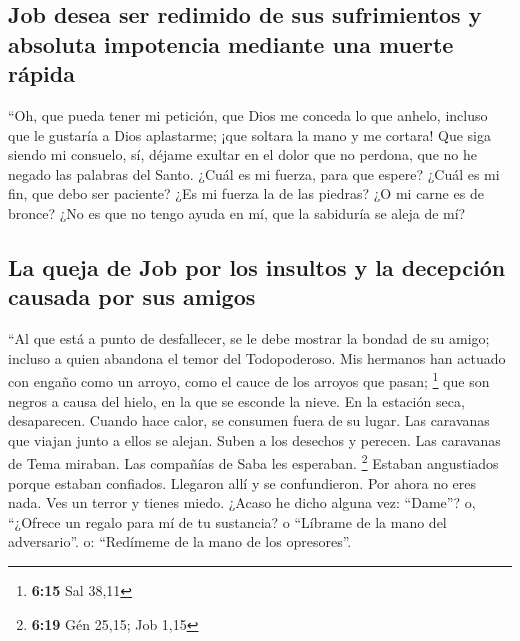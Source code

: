 \hypertarget{job-desea-ser-redimido-de-sus-sufrimientos-y-absoluta-impotencia-mediante-una-muerte-ruxe1pida}{%
\subsection{Job desea ser redimido de sus sufrimientos y absoluta
impotencia mediante una muerte
rápida}\label{job-desea-ser-redimido-de-sus-sufrimientos-y-absoluta-impotencia-mediante-una-muerte-ruxe1pida}}

 ``Oh, que pueda tener mi petición, que Dios me conceda lo
que anhelo,  incluso que le gustaría a Dios aplastarme;
¡que soltara la mano y me cortara!  Que siga siendo mi
consuelo, sí, déjame exultar en el dolor que no perdona, que no he
negado las palabras del Santo.  ¿Cuál es mi fuerza, para
que espere? ¿Cuál es mi fin, que debo ser paciente?  ¿Es
mi fuerza la de las piedras? ¿O mi carne es de bronce? 
¿No es que no tengo ayuda en mí, que la sabiduría se aleja de mí?

\hypertarget{la-queja-de-job-por-los-insultos-y-la-decepciuxf3n-causada-por-sus-amigos}{%
\subsection{La queja de Job por los insultos y la decepción causada por
sus
amigos}\label{la-queja-de-job-por-los-insultos-y-la-decepciuxf3n-causada-por-sus-amigos}}

 ``Al que está a punto de desfallecer, se le debe mostrar
la bondad de su amigo; incluso a quien abandona el temor del
Todopoderoso.  Mis hermanos han actuado con engaño como
un arroyo, como el cauce de los arroyos que pasan; \footnote{\textbf{6:15}
  Sal 38,11}  que son negros a causa del hielo, en la que
se esconde la nieve.  En la estación seca, desaparecen.
Cuando hace calor, se consumen fuera de su lugar.  Las
caravanas que viajan junto a ellos se alejan. Suben a los desechos y
perecen.  Las caravanas de Tema miraban. Las compañías de
Saba les esperaban. \footnote{\textbf{6:19} Gén 25,15; Job 1,15}
 Estaban angustiados porque estaban confiados. Llegaron
allí y se confundieron.  Por ahora no eres nada. Ves un
terror y tienes miedo.  ¿Acaso he dicho alguna vez:
``Dame''? o, ``¿Ofrece un regalo para mí de tu sustancia?
 o ``Líbrame de la mano del adversario''. o: ``Redímeme
de la mano de los opresores''.

